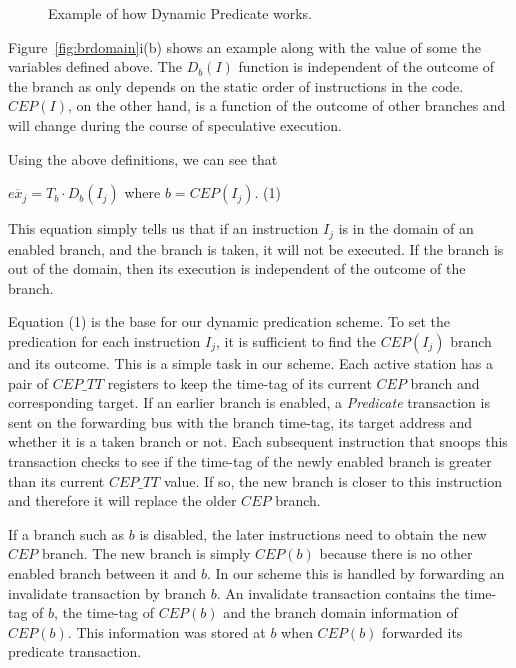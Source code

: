 \documentclass[10pt,twocolumn]{IEEEtran}
\begin{document}
\begin{figure}
{}
\caption{Example of how Dynamic Predicate works.}
\label{fig:dynpred}
\end{figure}  

Figure~\ref{fig:brdomain}i(b) shows an example along with the value of
some the variables defined above.  The $D_b(I)$ function is independent
of the outcome of the branch as only depends on the static order of
instructions in the code.  $CEP(I)$, on the other hand, is a function
of the outcome of other branches and will change during the course of
speculative execution.

Using the above definitions, we can see that

$\overline{ex_j} = T_b \cdot D_b(I_j)$  where $b = CEP(I_j)$.   (1)

This equation simply tells us that if an instruction $I_j$ is in the
domain of an enabled branch, and the branch is taken, it will not be
executed.  If the branch is out of the domain, then its execution is
independent of the outcome of the branch.

Equation (1) is the base for our dynamic predication scheme.  To set
the predication for each instruction $I_j$, it is sufficient to find
the $CEP(I_j)$ branch and its outcome.  This is a simple task in our
scheme.  Each active station has a pair of $CEP\_TT$ registers to keep
the time-tag of its current $CEP$ branch and corresponding target.  If
an earlier branch is enabled, a \emph{Predicate} transaction is sent on
the forwarding bus with the branch time-tag, its target address and
whether it is a taken branch or not. Each subsequent instruction that
snoops this transaction checks to see if the time-tag of the newly
enabled branch is greater than its current $CEP\_TT$ value. If so, the
new branch is closer to this instruction and therefore it will replace
the older $CEP$ branch.

If a branch such as $b$ is disabled, the later instructions need to
obtain the new $CEP$ branch.  The new branch is simply $CEP(b)$ because
there is no other enabled branch between it and $b$.  In our scheme
this is handled by forwarding an invalidate transaction by branch $b$.
An invalidate transaction contains the time-tag of $b$, the time-tag of
$CEP(b)$ and the branch domain information of $CEP(b)$.  This
information was stored at $b$ when $CEP(b)$ forwarded its predicate
transaction.
\end{document}
